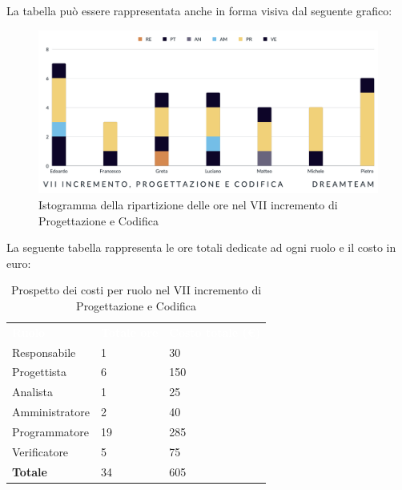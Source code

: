 La tabella può essere rappresentata anche in forma visiva dal seguente grafico:
\begin{figure}[H]
\centering
\includegraphics[scale=0.55]{Sezioni/SezioniPreventivo/grafici/Preventivo_progettazione_VII.png}
\caption{Istogramma della ripartizione delle ore nel VII incremento di Progettazione e Codifica}
\end{figure}

La seguente tabella rappresenta le ore totali dedicate ad ogni ruolo e il costo in euro:

\begin{table}[H]
\begin{center}
\renewcommand{\arraystretch}{1.5}
\begin{tabular}{ m{}<{\centering}  m{}<{\centering} m{}<{\centering}}
	\rowcolor{darkblue}
	\textcolor{white}{\textbf{Ruolo}}&\textcolor{white}{\textbf{Totale ore}}&\textcolor{white}{\textbf{Costo totale (\euro)}}\\ 

	Responsabile  & 1 & 30 \\	
	
	Progettista & 6 & 150 \\
	
	Analista & 1 & 25 \\

	Amministratore & 2 & 40 \\
	
	Programmatore & 19 & 285 \\
	
	Verificatore & 5 & 75 \\
	
	\textbf{Totale} & 34 & 605 \\
	
\end{tabular}
\caption{Prospetto dei costi per ruolo nel VII incremento di Progettazione e Codifica}
\end{center}
\end{table}

